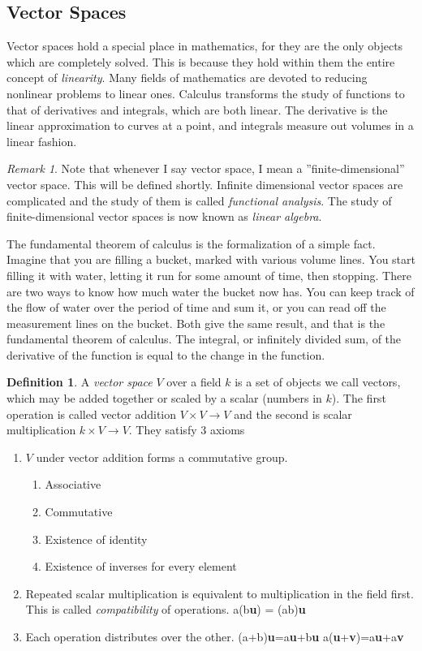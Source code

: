 \documentclass[12pt]{article}
\theoremstyle{definition}
\newtheorem{definition}{Definition}[section]
\theoremstyle{remark}
\newtheorem*{remark}{Remark}
\theoremstyle{example}
\theoremstyle{theorem}
\theoremstyle{lemma}
\def\b#1{\textbf{#1}}
\begin{document}
\subsection{Vector Spaces}

Vector spaces hold a special place in mathematics, for they are the only objects which are completely solved. This is because they hold within them the entire concept of \textit{linearity}. Many fields of mathematics are devoted to reducing nonlinear problems to linear ones. Calculus transforms the study of functions to that of derivatives and integrals, which are both linear. The derivative is the linear approximation to curves at a point, and integrals measure out volumes in a linear fashion.

\begin{remark}
	Note that whenever I say vector space, I mean a ''finite-dimensional'' vector space. This will be defined shortly. Infinite dimensional vector spaces are complicated and the study of them is called \textit{functional analysis}. The study of finite-dimensional vector spaces is now known as \textit{linear algebra}.
\end{remark}

The fundamental theorem of calculus is the formalization of a simple fact. Imagine that you are filling a bucket, marked with various volume lines. You start filling it with water, letting it run for some amount of time, then stopping. There are two ways to know how much water the bucket now has. You can keep track of the flow of water over the period of time and sum it, or you can read off the measurement lines on the bucket. Both give the same result, and that is the fundamental theorem of calculus. The integral, or infinitely divided sum, of the derivative of the function is equal to the change in the function.


\begin{definition}
	A \textit{vector space} $V$ over a field $k$ is a set of objects we call vectors, which may be added together or scaled by a scalar (numbers in $k$). The first operation is called vector addition $V\times V\to V$ and the second is scalar multiplication $k\times V\to V$. They satisfy 3 axioms
	
	\begin{enumerate}
		\item $V$ under vector addition forms a commutative group.
		\begin{enumerate}
			\item Associative
			\item Commutative
			\item Existence of identity
			\item Existence of inverses for every element
		\end{enumerate}
		\item Repeated scalar multiplication is equivalent to multiplication in the field first. This is called \textit{compatibility} of operations.
		\subitem a(b\b{u}) = (ab)\b{u}
		\item Each operation distributes over the other.
		\subitem (a+b)\b{u}=a\b{u}+b\b{u}
		\subitem a(\b{u}+\b{v})=a\b{u}+a\b{v}
	\end{enumerate}
\end{definition}
\end{document}
